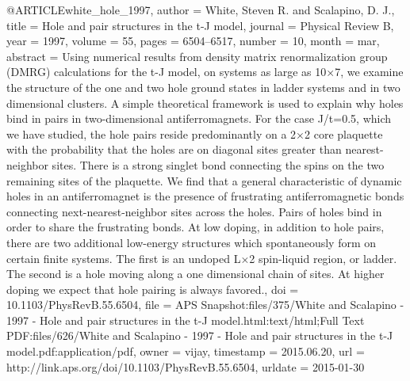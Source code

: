 @ARTICLE{white_hole_1997,
  author = {White, Steven R. and Scalapino, D. J.},
  title = {Hole and pair structures in the t-{J} model},
  journal = {Physical Review B},
  year = {1997},
  volume = {55},
  pages = {6504--6517},
  number = {10},
  month = mar,
  abstract = {Using numerical results from density matrix renormalization group
	(DMRG) calculations for the t-J model, on systems as large as 10×7,
	we examine the structure of the one and two hole ground states in
	ladder systems and in two dimensional clusters. A simple theoretical
	framework is used to explain why holes bind in pairs in two-dimensional
	antiferromagnets. For the case J/t=0.5, which we have studied, the
	hole pairs reside predominantly on a 2×2 core plaquette with the
	probability that the holes are on diagonal sites greater than nearest-neighbor
	sites. There is a strong singlet bond connecting the spins on the
	two remaining sites of the plaquette. We find that a general characteristic
	of dynamic holes in an antiferromagnet is the presence of frustrating
	antiferromagnetic bonds connecting next-nearest-neighbor sites across
	the holes. Pairs of holes bind in order to share the frustrating
	bonds. At low doping, in addition to hole pairs, there are two additional
	low-energy structures which spontaneously form on certain finite
	systems. The first is an undoped L×2 spin-liquid region, or ladder.
	The second is a hole moving along a one dimensional chain of sites.
	At higher doping we expect that hole pairing is always favored.},
  doi = {10.1103/PhysRevB.55.6504},
  file = {APS Snapshot:files/375/White and Scalapino - 1997 - Hole and pair structures in the t-J model.html:text/html;Full Text PDF:files/626/White and Scalapino - 1997 - Hole and pair structures in the t-J model.pdf:application/pdf},
  owner = {vijay},
  timestamp = {2015.06.20},
  url = {http://link.aps.org/doi/10.1103/PhysRevB.55.6504},
  urldate = {2015-01-30}
}

